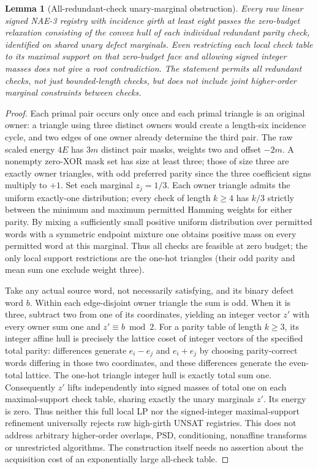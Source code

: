 \documentclass[11pt]{article}
\newtheorem{lemma}[theorem]{Lemma}
\begin{document}
\begin{lemma}[All-redundant-check unary-marginal obstruction]\label{lem:ms28-allchecks}
Every raw linear signed NAE-3 registry with incidence girth at least eight passes the zero-budget relaxation consisting of the convex hull of each individual redundant parity check, identified on shared unary defect marginals. Even restricting each local check table to its maximal support on that zero-budget face and allowing signed integer masses does not give a root contradiction. The statement permits all redundant checks, not just bounded-length checks, but does not include joint higher-order marginal constraints between checks.
\end{lemma}
\begin{proof}
Each primal pair occurs only once and each primal triangle is an original owner: a triangle using three distinct owners would create a length-six incidence cycle, and two edges of one owner already determine the third pair. The raw scaled energy $4E$ has $3m$ distinct pair masks, weights two and offset $-2m$. A nonempty zero-XOR mask set has size at least three; those of size three are exactly owner triangles, with odd preferred parity since the three coefficient signs multiply to $+1$. Set each marginal $z_j=1/3$. Each owner triangle admits the uniform exactly-one distribution; every check of length $k\ge4$ has $k/3$ strictly between the minimum and maximum permitted Hamming weights for either parity. By mixing a sufficiently small positive uniform distribution over permitted words with a symmetric endpoint mixture one obtains positive mass on every permitted word at this marginal. Thus all checks are feasible at zero budget; the only local support restrictions are the one-hot triangles (their odd parity and mean sum one exclude weight three).

Take any actual source word, not necessarily satisfying, and its binary defect word $b$. Within each edge-disjoint owner triangle the sum is odd. When it is three, subtract two from one of its coordinates, yielding an integer vector $z'$ with every owner sum one and $z'\equiv b\bmod2$. For a parity table of length $k\ge3$, its integer affine hull is precisely the lattice coset of integer vectors of the specified total parity: differences generate $e_i-e_j$ and $e_i+e_j$ by choosing parity-correct words differing in those two coordinates, and these differences generate the even-total lattice. The one-hot triangle integer hull is exactly total sum one. Consequently $z'$ lifts independently into signed masses of total one on each maximal-support check table, sharing exactly the unary marginals $z'$. Its energy is zero. Thus neither this full local LP nor the signed-integer maximal-support refinement universally rejects raw high-girth UNSAT registries. This does not address arbitrary higher-order overlaps, PSD, conditioning, nonaffine transforms or unrestricted algorithms. The construction itself needs no assertion about the acquisition cost of an exponentially large all-check table.
\end{proof}
\end{document}
